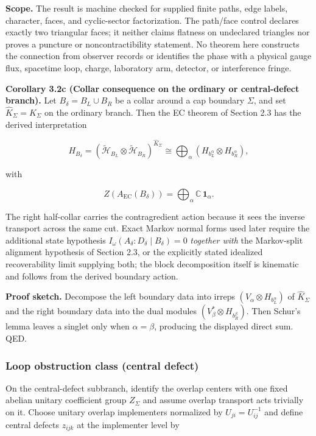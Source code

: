 \textbf{Scope.} The result is machine checked for supplied finite paths, edge
labels, character, faces, and cyclic-sector factorization. The path/face
control declares exactly two triangular faces; it neither claims flatness on
undeclared triangles nor proves a puncture or noncontractibility statement.
No theorem here constructs the connection from observer records or identifies
the phase with a physical gauge flux, spacetime loop, charge, laboratory arm,
detector, or
interference fringe.

\textbf{Corollary 3.2c (Collar consequence on the ordinary or central-defect branch).} Let \(B_\delta = B_L \cup B_R\) be a collar around a cap boundary \(\Sigma\), and set \(\widehat K_\Sigma = K_\Sigma\) on the ordinary branch. Then the EC theorem of Section 2.3 has the derived interpretation

\[
H_{B_\delta}
=
(\tilde{\mathcal H}_{B_L}\otimes \tilde{\mathcal H}_{B_R})^{\widehat K_\Sigma}
\cong
\bigoplus_\alpha
(H_{b_L^\alpha}\otimes H_{b_R^\alpha}),
\]

with

\[
Z(A_{\mathrm{EC}}(B_\delta)) = \bigoplus_\alpha \mathbb C\,\mathbf 1_\alpha.
\]

The right half-collar carries the contragredient action because it sees the inverse transport across the same cut. Exact Markov normal forms used later require the additional state hypothesis \(I_\omega(A_\delta:D_\delta \mid B_\delta)=0\) \emph{together with} the Markov-split alignment hypothesis of Section 2.3, or the explicitly stated idealized recoverability limit supplying both; the block decomposition itself is kinematic and follows from the derived boundary action.

\textbf{Proof sketch.} Decompose the left boundary data into irreps \((V_\alpha \otimes H_{b_L^\alpha})\) of \(\widehat K_\Sigma\) and the right boundary data into the dual modules \((V_\beta^* \otimes H_{b_R^\beta})\). Then Schur's lemma leaves a singlet only when \(\alpha=\beta\), producing the displayed direct sum. QED.

\subsubsection{Loop obstruction class (central defect)}\label{33-loop-obstruction-class-central-defect}

On the central-defect subbranch, identify the overlap centers with one fixed abelian unitary
coefficient group \(Z_\Sigma\) and assume overlap transport acts trivially on it. Choose unitary
overlap implementers normalized by \(U_{ji}=U_{ij}^{-1}\) and define central defects
\(z_{ijk}\) at the implementer level by

